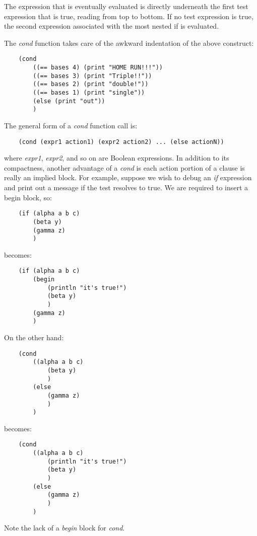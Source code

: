 The expression that is eventually evaluated is
directly underneath the first test expression
that is true, reading from top to bottom.
If no test expression is true, the second expression associated
with the most nested if is evaluated.

The {\it cond} function takes care  of the awkward indentation
of the above construct:

\begin{verbatim}
    (cond
        ((== bases 4) (print "HOME RUN!!!"))
        ((== bases 3) (print "Triple!!"))
        ((== bases 2) (print "double!"))
        ((== bases 1) (print "single"))
        (else (print "out"))
        )
\end{verbatim}

The general form of a {\it cond} function call is:

\begin{verbatim}
    (cond (expr1 action1) (expr2 action2) ... (else actionN))
\end{verbatim}

where {\it expr1}, {\it expr2}, and so on are Boolean expressions. In addition
to its compactness, another advantage of a {\it cond} is each action
portion of a clause is really an implied block. For example,
suppose we wish to debug an {\it if} expression and print out a
message if the test resolves to true. We are required to insert
a begin block, so:

\begin{verbatim}
    (if (alpha a b c)
        (beta y)
        (gamma z)
        )
\end{verbatim}

becomes:

\begin{verbatim}
    (if (alpha a b c)
        (begin
            (println "it's true!")
            (beta y)
            )
        (gamma z)
        )
\end{verbatim}

On the other hand:

\begin{verbatim}
    (cond
        ((alpha a b c)
            (beta y)
            )
        (else
            (gamma z)
            )
        )
\end{verbatim}

becomes:

\begin{verbatim}
    (cond
        ((alpha a b c)
            (println "it's true!")
            (beta y)
            )
        (else
            (gamma z)
            )
        )
\end{verbatim}

Note the lack of a {\it begin} block for {\it cond}.

